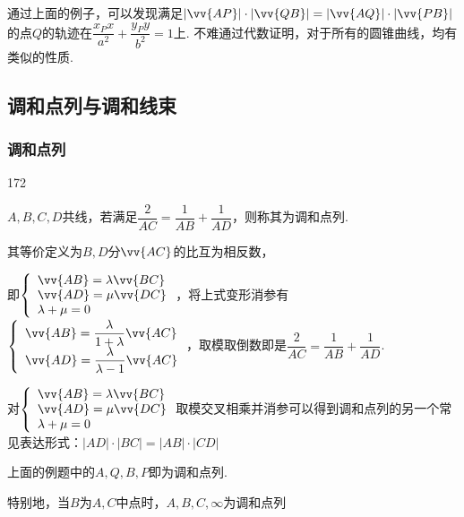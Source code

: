 \begin{vspace_}
\vsp[8]
\end{vspace_}



通过上面的例子，可以发现满足$\left| \vv{AP}\right|  \cdot  \left| \vv{QB}\right|  = \left| \vv{AQ}\right|  \cdot  \left| \vv{PB}\right|$的点$Q$的轨迹在$\dfrac{x_Px}{a^2}+\dfrac{y_Py}{b^2} = 1$上. 不难通过代数证明，对于所有的圆锥曲线，均有类似的性质.

\subsection*{调和点列与调和线束}
\subsubsection*{调和点列}
\begin{dingautolist}{172}
    \item $A,B,C,D$共线，若满足$\dfrac{2}{AC} = \dfrac{1}{AB} + \dfrac{1}{AD}$，则称其为调和点列.
    \item 其等价定义为$B,D$分$\vv{AC}$的比互为相反数，
    
    即$\left\{\begin{array}{l}
         \vv{AB} = \lambda \vv{BC}  \\
         \vv{AD} = \mu \vv{DC} \\
         \lambda + \mu = 0
    \end{array}\right.$，将上式变形消参有$\left\{\begin{array}{l}
         \vv{AB} = \dfrac{\lambda}{1+\lambda} \vv{AC} \\
         \vv{AD} = \dfrac{\lambda}{\lambda-1} \vv{AC} \\
    \end{array}\right.$，取模取倒数即是$\dfrac{2}{AC} = \dfrac{1}{AB} + \dfrac{1}{AD}$.
    \item 对$\left\{\begin{array}{l}
         \vv{AB} = \lambda \vv{BC}  \\
         \vv{AD} = \mu \vv{DC} \\
         \lambda + \mu = 0
    \end{array}\right.$取模交叉相乘并消参可以得到调和点列的另一个常见表达形式：$|AD| \cdot |BC| = |AB| \cdot |CD|$

    上面的例题中的$A,Q,B,P$即为调和点列.
    \item 特别地，当$B$为$A, C$中点时，$A,B,C,\infty$为调和点列
\end{dingautolist}
